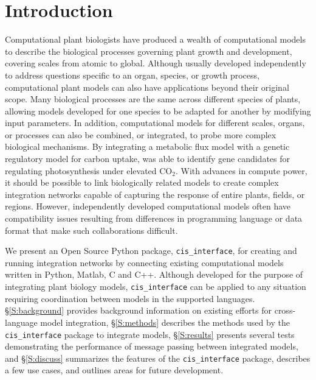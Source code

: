 \documentclass[journal]{IEEEtran}
\newcommand{\cis}{{\tt cis\_interface}{}}
\begin{document}
\section{Introduction}\label{S:intro}
%
Computational plant biologists have produced a wealth of computational models to describe the biological processes governing plant growth and development, covering scales from atomic to global. Although usually developed independently to address questions specific to an organ, species, or growth process, computational plant models can also have applications beyond their original scope. Many biological processes are the same across different species of plants, allowing models developed for one species to be adapted for another by modifying input parameters. In addition, computational models for different scales, organs, or processes can also be combined, or integrated, to probe more complex biological mechanisms. By integrating a metabolic flux model with a genetic regulatory model for carbon uptake, \citet{integration_prep} was able to identify gene candidates for regulating photosynthesis under elevated CO$_{2}$. With advances in compute power, it should be possible to link biologically related models to create complex integration networks capable of capturing the response of entire plants, fields, or regions. However, independently developed computational models often have compatibility issues resulting from differences in programming language or data format that make such collaborations difficult. 

We present an Open Source Python package, {\cis}, for creating and running integration networks by connecting existing computational models written in Python, Matlab, C and C++. Although developed for the purpose of integrating plant biology models, {\cis} can be applied to any situation requiring coordination between models in the supported languages. \S\ref{S:background} provides background information on existing efforts for cross-language model integration, \S\ref{S:methods} describes the methods used by the {\cis} package to integrate models, \S\ref{S:results} presents several tests demonstrating the performance of message passing between integrated models, and \S\ref{S:discuss} summarizes the features of the {\cis} package, describes a few use cases, and outlines areas for future development.

\end{document}

